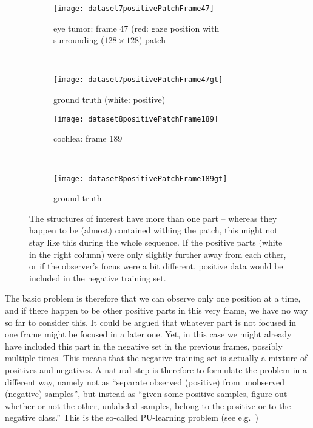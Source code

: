 \begin{figure}[ht]
	\centering
	\begin{subfigure}[h]{0.48\textwidth}
		\texttt{[image: dataset7positivePatchFrame47]}
		\caption*{eye tumor: frame 47 (red: gaze position with surrounding ($128\times128$)-patch}
	\end{subfigure}
	~
	\begin{subfigure}[h]{0.48\textwidth}
	    \texttt{[image: dataset7positivePatchFrame47gt]}
	    \caption*{ground truth (white: positive) \newline}
	\end{subfigure}
	
	\vspace{3mm}
	\begin{subfigure}[h]{0.48\textwidth}
		\texttt{[image: dataset8positivePatchFrame189]}	
		\caption*{cochlea: frame 189}
	\end{subfigure}
	~
	\begin{subfigure}[h]{0.48\textwidth}
		\texttt{[image: dataset8positivePatchFrame189gt]}	
		\caption*{ground truth}
	\end{subfigure}
	\caption{The structures of interest have more than one part -- whereas they happen to be (almost) contained withing the patch, this might not stay like this during the whole sequence. If the positive parts (white in the right column) were only slightly further away from each other, or if the observer's focus were a bit different, positive data would be included in the negative training set.}
	\label{fig:nonValidAssumptionD78}
\end{figure}

The basic problem is therefore that we can observe only one position at a time, and if there happen to be other positive parts in this very frame, we have no way so far to consider this. 
It could be argued that whatever part is not focused in one frame might be focused in a later one. 
Yet, in this case we might already have included this part in the negative set in the previous frames, possibly multiple times. 
This means that the negative training set is actually a mixture of positives and negatives.
A natural step is therefore to formulate the problem in a different way, namely not as ``separate observed (positive) from unobserved (negative) samples'', but instead as ``given some positive samples, figure out whether or not the other, unlabeled samples, belong to the positive or to the negative class.'' This is the so-called PU-learning problem (see e.g.\ \cite{elkan2008learning})

